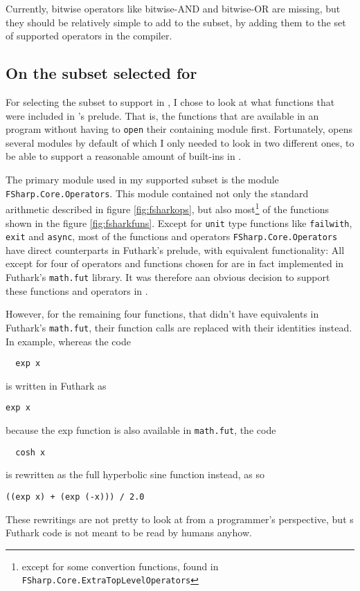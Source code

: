 Currently, bitwise operators like bitwise-AND and bitwise-OR are missing, but
they should be relatively simple to add to the \fshark{} subset, by adding them
to the set of supported operators in the \fshark{} compiler.

\subsection*{On the \fsharp{} subset selected for \fshark{}}
For selecting the \fsharp{} subset to support in \fshark{}, I chose to look at
what functions that were included in \fsharp{}'s prelude. That is, the
functions that are available in an \fsharp{} program without having to
\texttt{open} their containing module first.
Fortunately, \fsharp{} opens several modules by default of which I only
needed to look in two different ones, to be able to support a reasonable amount
of \fsharp{} built-ins in \fshark{}.

The primary module used in my supported \fsharp{} subset is the module
\texttt{FSharp.Core.Operators}.
This module contained not only the standard arithmetic described in figure
\ref{fig:fsharkops}, but also most\footnote{except for some convertion
  functions, found in \texttt{FSharp.Core.ExtraTopLevelOperators}} of the functions shown in the figure \ref{fig:fsharkfuns}.
Except for \texttt{unit} type functions like \texttt{failwith}, \texttt{exit}
and \texttt{async}, most of the functions and operators
\texttt{FSharp.Core.Operators} have direct counterparts in Futhark's prelude,
with equivalent functionality: All except for four of operators and functions chosen for
\fshark{} are in fact implemented in Futhark's \texttt{math.fut} library.
It was therefore aan obvious decision to support these functions and operators in
\fshark{}.

However, for the remaining four functions, that didn't have equivalents in
Futhark's \texttt{math.fut}, their function calls are replaced with their
identities instead.
In example, whereas the \fshark{} code
\begin{verbatim}
  exp x
\end{verbatim}
is written in Futhark as 
\begin{lstlisting}[language=Futhark]
  exp x
\end{lstlisting}
because the exp function is also available in \texttt{math.fut}, the \fshark{}
code
\begin{verbatim}
  cosh x
\end{verbatim}
is rewritten as the full hyperbolic sine function instead, as so
\begin{lstlisting}[language=Futhark]
  ((exp x) + (exp (-x))) / 2.0
\end{lstlisting}
These rewritings are not pretty to look at from a programmer's perspective, but
\fshark{}s Futhark code is not meant to be read by humans anyhow.

